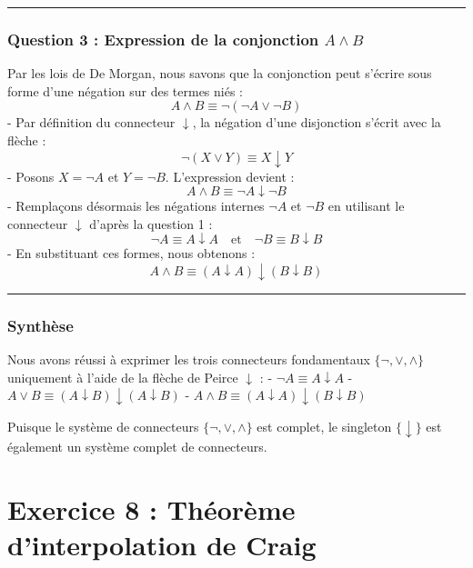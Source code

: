 \documentclass[11pt,a4paper]{article}
\begin{document}
\begin{center}\rule{0.5\linewidth}{0.5pt}\end{center}

\hypertarget{question-3-expression-de-la-conjonction-a-land-b}{%
\subsubsection{\texorpdfstring{Question 3 : Expression de la conjonction
\(A \land B\)}{Question 3 : Expression de la conjonction A \textbackslash land B}}\label{question-3-expression-de-la-conjonction-a-land-b}}

Par les lois de De Morgan, nous savons que la conjonction peut s'écrire
sous forme d'une négation sur des termes niés :
\[A \land B \equiv \neg(\neg A \lor \neg B)\] - Par définition du
connecteur \(\downarrow\), la négation d'une disjonction s'écrit avec la
flèche : \[\neg(X \lor Y) \equiv X \downarrow Y\] - Posons
\(X = \neg A\) et \(Y = \neg B\). L'expression devient :
\[A \land B \equiv \neg A \downarrow \neg B\] - Remplaçons désormais les
négations internes \(\neg A\) et \(\neg B\) en utilisant le connecteur
\(\downarrow\) d'après la question 1 :
\[\neg A \equiv A \downarrow A \quad \text{et} \quad \neg B \equiv B \downarrow B\]
- En substituant ces formes, nous obtenons :
\[A \land B \equiv (A \downarrow A) \downarrow (B \downarrow B)\]

\begin{center}\rule{0.5\linewidth}{0.5pt}\end{center}

\hypertarget{synthuxe8se}{%
\subsubsection{Synthèse}\label{synthuxe8se}}

Nous avons réussi à exprimer les trois connecteurs fondamentaux
\(\{\neg, \lor, \land\}\) uniquement à l'aide de la flèche de Peirce
\(\downarrow\) : - \(\neg A \equiv A \downarrow A\) -
\(A \lor B \equiv (A \downarrow B) \downarrow (A \downarrow B)\) -
\(A \land B \equiv (A \downarrow A) \downarrow (B \downarrow B)\)

Puisque le système de connecteurs \(\{\neg, \lor, \land\}\) est complet,
le singleton \(\{\downarrow\}\) est également un système complet de
connecteurs.
\n
\hypertarget{exercice-8-thuxe9oruxe8me-dinterpolation-de-craig}{%
\section{Exercice 8 : Théorème d'interpolation de
Craig}\label{exercice-8-thuxe9oruxe8me-dinterpolation-de-craig}}
\end{document}
